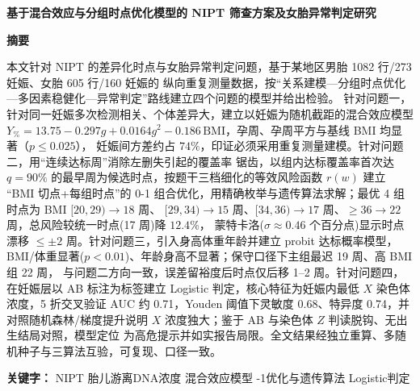 \documentclass[fontset=windows, 12pt, a4paper]{ctexart}
\newcommand{\papertitle}[1]{%
  \thispagestyle{empty}%
  \begin{center}
    {\fontsize{17.3pt}{22pt}\bfseries #1}
  \end{center}
  \vspace{1em}
}
\newcommand{\abstractcn}[2]{%
  \thispagestyle{empty}%
  \begin{center}{\fontsize{14pt}{17pt}\bfseries 摘要}\end{center}
  #1\par
  \vspace{1em}
  {\heiti\bfseries 关键字：}#2\par
  \newpage
}
\newcommand{\referencescn}{%
  \addcontentsline{toc}{section}{参考文献}%
}
\begin{document}
\papertitle{基于混合效应与分组时点优化模型的 NIPT 筛查方案及女胎异常判定研究}

\abstractcn{%
本文针对 NIPT 的差异化时点与女胎异常判定问题，基于某地区男胎 1082 行/273 妊娠、女胎 605 行/160 妊娠的
纵向重复测量数据，按“关系建模—分组时点优化—多因素稳健化—异常判定”路线建立四个问题的模型并给出检验。
针对问题一，针对同一妊娠多次检测相关、个体差异大，建立以妊娠为随机截距的混合效应模型
$Y_{\%}=13.75-0.297g+0.0164g^2-0.186\,\mathrm{BMI}$，孕周、孕周平方与基线 BMI 均显著（$p\le0.025$），
妊娠间方差约占 $74\%$，印证必须采用重复测量建模。针对问题二，用“连续达标周”消除左删失引起的覆盖率
锯齿，以组内达标覆盖率首次达 $q=90\%$ 的最早周为候选时点，按题干三档细化的等效风险函数 $r(w)$ 建立
“BMI 切点+每组时点”的 0-1 组合优化，用精确枚举与遗传算法求解；最优 4 组时点为 BMI $[20,29)\to18$ 周、
$[29,34)\to15$ 周、$[34,36)\to17$ 周、$\ge36\to22$ 周，总风险较统一时点(17 周)降 $12.4\%$，
蒙特卡洛($\sigma\approx0.46$ 个百分点)显示时点漂移 $\le\pm2$ 周。针对问题三，引入身高体重年龄并建立
probit 达标概率模型，BMI/体重显著($p<0.01$)、年龄身高不显著；保守口径下主组最迟 19 周、高 BMI 组 22 周，
与问题二方向一致，误差留裕度后时点仅后移 1--2 周。针对问题四，在妊娠层以 AB 标注为标签建立 Logistic
判定，核心特征为妊娠内最低 $X$ 染色体浓度，5 折交叉验证 AUC 约 0.71，Youden 阈值下灵敏度 0.68、特异度
0.74，并对照随机森林/梯度提升说明 $X$ 浓度独大；鉴于 AB 与染色体 $Z$ 判读脱钩、无出生结局对照，模型定位
为高危提示并如实报告局限。全文结果经独立重算、多随机种子与三算法互验，可复现、口径一致。%
}{%
NIPT \quad 胎儿游离DNA浓度 \quad 混合效应模型 \quad 0-1优化与遗传算法 \quad Logistic判定%
}












\newpage
\referencescn
\end{document}
